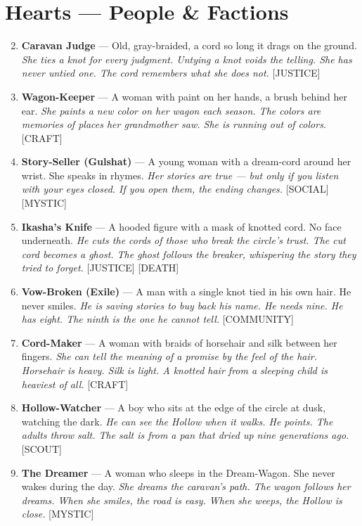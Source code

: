 \section*{Hearts --- People \& Factions}
\label{sec:tulkani-people}
\begin{enumerate}
\setcounter{enumi}{1}
\item \textbf{Caravan Judge} --- Old, gray-braided, a cord so long it drags on the ground.
  \hfill \textit{She ties a knot for every judgment. Untying a knot voids the telling. She has never untied one. The cord remembers what she does not.} [JUSTICE]
\item \textbf{Wagon-Keeper} --- A woman with paint on her hands, a brush behind her ear.
  \hfill \textit{She paints a new color on her wagon each season. The colors are memories of places her grandmother saw. She is running out of colors.} [CRAFT]
\item \textbf{Story-Seller (Gulshat)} --- A young woman with a dream-cord around her wrist. She speaks in rhymes.
  \hfill \textit{Her stories are true --- but only if you listen with your eyes closed. If you open them, the ending changes.} [SOCIAL] [MYSTIC]
\item \textbf{Ikasha's Knife} --- A hooded figure with a mask of knotted cord. No face underneath.
  \hfill \textit{He cuts the cords of those who break the circle's trust. The cut cord becomes a ghost. The ghost follows the breaker, whispering the story they tried to forget.} [JUSTICE] [DEATH]
\item \textbf{Vow-Broken (Exile)} --- A man with a single knot tied in his own hair. He never smiles.
  \hfill \textit{He is saving stories to buy back his name. He needs nine. He has eight. The ninth is the one he cannot tell.} [COMMUNITY]
\item \textbf{Cord-Maker} --- A woman with braids of horsehair and silk between her fingers.
  \hfill \textit{She can tell the meaning of a promise by the feel of the hair. Horsehair is heavy. Silk is light. A knotted hair from a sleeping child is heaviest of all.} [CRAFT]
\item \textbf{Hollow-Watcher} --- A boy who sits at the edge of the circle at dusk, watching the dark.
  \hfill \textit{He can see the Hollow when it walks. He points. The adults throw salt. The salt is from a pan that dried up nine generations ago.} [SCOUT]
\item \textbf{The Dreamer} --- A woman who sleeps in the Dream-Wagon. She never wakes during the day.
  \hfill \textit{She dreams the caravan's path. The wagon follows her dreams. When she smiles, the road is easy. When she weeps, the Hollow is close.} [MYSTIC]

\end{enumerate}
